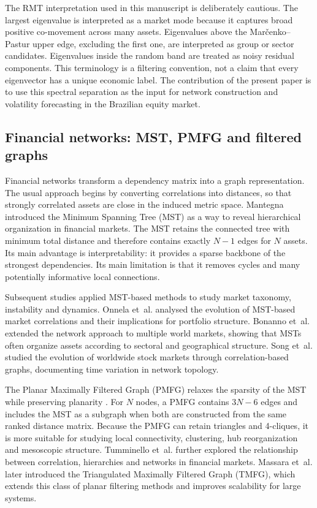 The RMT interpretation used in this manuscript is deliberately cautious. The largest eigenvalue is interpreted as a market mode because it captures broad positive co-movement across many assets. Eigenvalues above the Mar\v{c}enko--Pastur upper edge, excluding the first one, are interpreted as group or sector candidates. Eigenvalues inside the random band are treated as noisy residual components. This terminology is a filtering convention, not a claim that every eigenvector has a unique economic label. The contribution of the present paper is to use this spectral separation as the input for network construction and volatility forecasting in the Brazilian equity market.

\subsection{Financial networks: MST, PMFG and filtered graphs}

Financial networks transform a dependency matrix into a graph representation. The usual approach begins by converting correlations into distances, so that strongly correlated assets are close in the induced metric space. Mantegna \cite{mantegna_1999_hierarchical} introduced the Minimum Spanning Tree (MST) as a way to reveal hierarchical organization in financial markets. The MST retains the connected tree with minimum total distance and therefore contains exactly $N-1$ edges for $N$ assets. Its main advantage is interpretability: it provides a sparse backbone of the strongest dependencies. Its main limitation is that it removes cycles and many potentially informative local connections.

Subsequent studies applied MST-based methods to study market taxonomy, instability and dynamics. Onnela et~al. \cite{onnela_2003_dynamics} analysed the evolution of MST-based market correlations and their implications for portfolio structure. Bonanno et~al. \cite{bonanno_2004_networks} extended the network approach to multiple world markets, showing that MSTs often organize assets according to sectoral and geographical structure. Song et~al. \cite{song_2012_evolution} studied the evolution of worldwide stock markets through correlation-based graphs, documenting time variation in network topology.

The Planar Maximally Filtered Graph (PMFG) relaxes the sparsity of the MST while preserving planarity \cite{tumminello_2005_tool}. For $N$ nodes, a PMFG contains $3N-6$ edges and includes the MST as a subgraph when both are constructed from the same ranked distance matrix. Because the PMFG can retain triangles and 4-cliques, it is more suitable for studying local connectivity, clustering, hub reorganization and mesoscopic structure. Tumminello et~al. \cite{tumminello_2010_correlation} further explored the relationship between correlation, hierarchies and networks in financial markets. Massara et~al. \cite{massara_2016_tmfg} later introduced the Triangulated Maximally Filtered Graph (TMFG), which extends this class of planar filtering methods and improves scalability for large systems.

